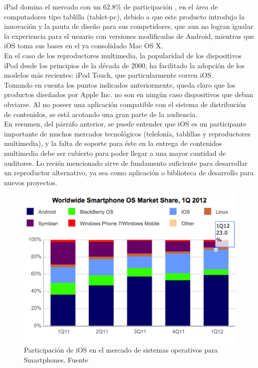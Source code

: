 iPad domina el mercado con un 62.8\% de participación \cite{sota:iPad-market}, en el área de computadores tipo tablilla (tablet-pc), debido a que este producto introdujo la innovación y la pauta de diseño para sus competidores, que aun no logran igualar la experiencia para el usuario con versiones modificadas de Android, mientras que iOS toma sus bases en el ya consolidado Mac OS X.\\

En el caso de los reproductores multimedia, la popularidad de los dispositivos iPod desde los principios de la década de 2000, ha facilitado la adopción de los modelos más recientes: iPod Touch, que particularmente corren iOS.\\

Tomando en cuenta los puntos indicados anteriormente, queda claro que los productos diseñados por Apple Inc. no son en ningún caso dispositivos que deban obviarse. Al no poseer una aplicación compatible con el sistema de distribución de contenidos, se está acotando una gran parte de la audiencia.\\

En resumen, del párrafo anterior, se puede entender que iOS es un participante importante de muchos mercados tecnológicos (telefonía, tablillas y reproductores multimedia), y la falta de soporte para éste en la entrega de contenidos multimedia debe ser cubierto para poder llegar a una mayor cantidad de auditores. Lo recién mencionado sirve de fundamento suficiente para desarrollar un reproductor alternativo, ya sea como aplicación o biblioteca de desarrollo para nuevos proyectos. \\

\begin{figure}[H]
	\centering
	\includegraphics[scale=0.8]{imgs/market-share-2012q1.png} 
	\caption{Participación de iOS en el mercado de sistemas operativos para Smartphones. Fuente \cite{sota:market-smartphones}}
	\label{market-share-2012q1}
\end{figure}



